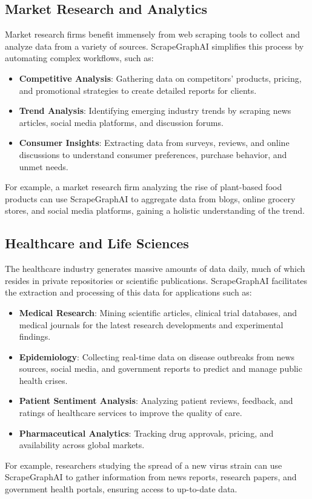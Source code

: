 \subsection{Market Research and Analytics}
Market research firms benefit immensely from web scraping tools to collect and analyze data from a variety of sources. ScrapeGraphAI simplifies this process by automating complex workflows, such as:
\begin{itemize}
    \item \textbf{Competitive Analysis}: Gathering data on competitors’ products, pricing, and promotional strategies to create detailed reports for clients.
    \item \textbf{Trend Analysis}: Identifying emerging industry trends by scraping news articles, social media platforms, and discussion forums.
    \item \textbf{Consumer Insights}: Extracting data from surveys, reviews, and online discussions to understand consumer preferences, purchase behavior, and unmet needs.
\end{itemize}
For example, a market research firm analyzing the rise of plant-based food products can use ScrapeGraphAI to aggregate data from blogs, online grocery stores, and social media platforms, gaining a holistic understanding of the trend.

\subsection{Healthcare and Life Sciences}
The healthcare industry generates massive amounts of data daily, much of which resides in private repositories or scientific publications. ScrapeGraphAI facilitates the extraction and processing of this data for applications such as:
\begin{itemize}
    \item \textbf{Medical Research}: Mining scientific articles, clinical trial databases, and medical journals for the latest research developments and experimental findings.
    \item \textbf{Epidemiology}: Collecting real-time data on disease outbreaks from news sources, social media, and government reports to predict and manage public health crises.
    \item \textbf{Patient Sentiment Analysis}: Analyzing patient reviews, feedback, and ratings of healthcare services to improve the quality of care.
    \item \textbf{Pharmaceutical Analytics}: Tracking drug approvals, pricing, and availability across global markets.
\end{itemize}
For example, researchers studying the spread of a new virus strain can use ScrapeGraphAI to gather information from news reports, research papers, and government health portals, ensuring access to up-to-date data.

